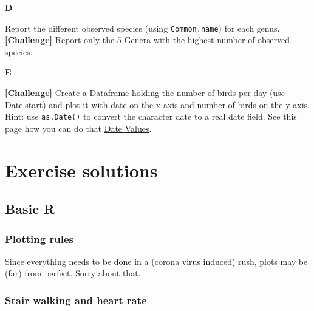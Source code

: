 \documentclass[]{book}
\begin{document}
\textbf{D}

Report the different observed species (using \texttt{Common.name}) for each genus. \textbf{{[}Challenge{]}} Report only the 5 Genera with the highest number of observed species.

\textbf{E}

\textbf{{[}Challenge{]}} Create a Dataframe holding the number of birds per day (use Date.start) and plot it with date on the x-axis and number of birds on the y-axis. Hint: use \texttt{as.Date()} to convert the character date to a real date field. See this page how you can do that \href{http://www.statmethods.net/input/dates.html}{Date Values}.

\hypertarget{exercise-solutions}{%
\chapter{Exercise solutions}\label{exercise-solutions}}

\hypertarget{basic-r-2}{%
\section{Basic R}\label{basic-r-2}}

\hypertarget{plotting-rules-1}{%
\subsection*{Plotting rules}\label{plotting-rules-1}}

Since everything needs to be done in a (corona virus induced) rush, plots may be (far) from perfect. Sorry about that.

\hypertarget{stair-walking-and-heart-rate-1}{%
\subsection{Stair walking and heart rate}\label{stair-walking-and-heart-rate-1}}
\end{document}
